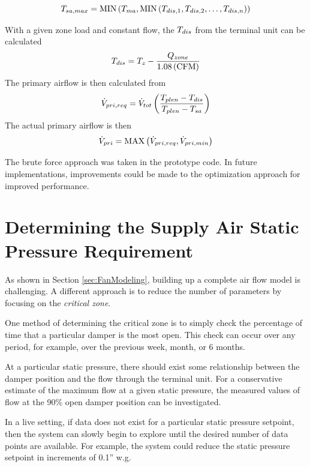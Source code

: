 \begin{equation}
    T_{sa,max} = \text{MIN}\left(T_{ma}, \text{MIN}\left(T_{dis,1}, T_{dis,2}, \ldots, T_{dis,n} \right) \right)
\end{equation}

With a given zone load and constant flow, the \(T_{dis}\) from the terminal
unit can be calculated
\begin{equation}
    T_{dis} = T_{z} -  \frac{Q_{zone}}{1.08 \left( \text{CFM} \right)   }
\end{equation}
The primary airflow is then calculated from
\begin{equation}
    \dot{V}_{pri, req} = \dot{V}_{tot} \left( \frac{T_{plen} - T_{dis} }{T_{plen} - T_{sa}} \right)
\end{equation}
The actual primary airflow is then
\begin{equation}
    \dot{V}_{pri} = \text{MAX}\left(\dot{V}_{pri, req}, \dot{V}_{pri, min}  \right)
\end{equation}

The brute force approach was taken in the prototype code. In future implementations,
improvements could be made to the optimization approach for improved
performance.

\section{Determining the Supply Air Static Pressure Requirement}

As shown in Section \ref{sec:FanModeling}, building up a complete air
flow model is challenging. A different approach is to reduce the number
of parameters by focusing on the \textit{critical zone}.

One method of determining the critical zone is to simply check the
percentage of time that a particular damper is the most open. This check
can occur over any period, for example, over the previous week, month,
or 6 months.

At a particular static pressure, there should exist some relationship
between the damper position and the flow through the terminal unit. For
a conservative estimate of the maximum flow at a given static pressure,
the measured values of flow at the 90\% open damper position can be
investigated.

In a live setting, if data does not exist for a particular static
pressure setpoint, then the system can slowly begin to explore until the
desired number of data points are available. For example, the system
could reduce the static pressure setpoint in increments of 0.1'' w.g.




%
%
%
%
%
%
%
%


